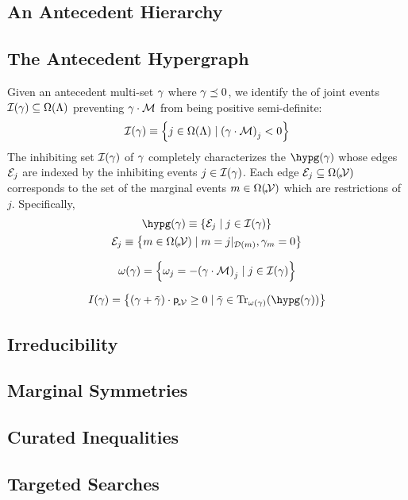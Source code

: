 \documentclass[aps, 10pt, english, twoside, twocolumn, pra, nofootinbib, tightenlines, longbibliography, superscriptaddress]{revtex4-1}
\begin{document}
    \subsection{An Antecedent Hierarchy}
    \subsection{The Antecedent Hypergraph}
    Given an antecedent multi-set $\gamma$ where $\gamma \preceq 0$, we identify the  of joint events $\inhibit{\ga} \subseteq \events{\jointvar}$ preventing $\gamma \cdot \mathcal{M}$ from being positive semi-definite:
    \[ \inhibit{\ga} \defined \bc{j \in \events{\jointvar} \mid \br{\ga\cdot\incidence}_{j} < 0} \]
    The inhibiting set $\inhibit{\ga}$ of $\gamma$ completely characterizes the  $\hypg\br{\ga}$ whose edges $\mathcal{E}_{j}$ are indexed by the inhibiting events $j \in \inhibit{\ga}$. Each edge $\edges_{j} \subseteq \events{\mscenariowrap}$ corresponds to the set of the marginal events $m \in \events{\mscenariowrap}$ which are restrictions of $j$. Specifically,
    \begin{gather*}
        \hypg\br{\ga} \defined \bc{\edges_j \mid j \in \inhibit{\ga}} \\
        \edges_{j} \defined \bc{m \in \events{\mscenariowrap} \mid m = \restrict{j}{\domain{m}}, \ga_{m} = 0}
    \end{gather*}

    \[ \w\br{\ga} = \bc{\w_j = - \br{\ga\cdot\incidence}_{j} \mid j \in \inhibit{\ga}} \]

    \[ I\br{\ga} = \bc{\br{\ga + \ti \ga} \cdot \prob{\mscenariowrap} \geq 0 \mid \ti \ga \in \transversals{\w\br{\ga}}{\hypg\br{\ga}}}\]

    \subsection{Irreducibility}
    \subsection{Marginal Symmetries}
    \label{sec:marginal_symmetries}
    \subsection{Curated Inequalities}
    \subsection{Targeted Searches}
\end{document}

